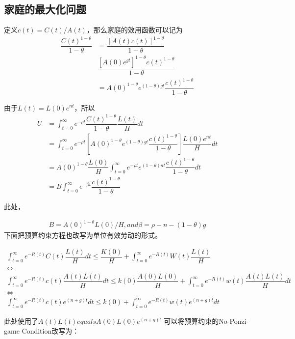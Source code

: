 \subsection{家庭的最大化问题} 

定义$  c(t)=C(t)/A(t) $，那么家庭的效用函数可以记为
\begin{align}
	\dfrac{C(t)^{1-\theta}}{1-\theta}&=\dfrac{[A(t)c(t)]^{1-\theta}}{1-\theta}
	\\
	&\dfrac{[A(0)e^{gt}]^{1-\theta}c(t)^{1-\theta}}{1-\theta}
	\\
	&=A(0)^{1-\theta}e^{(1-\theta)gt}\dfrac{c(t)^{1-\theta}}{1-\theta}
\end{align}

由于$ L(t) = L(0)e^{nt} $，所以
\begin{align}
	U&=\int_{t=0}^{\infty}e^{-\rho t}\dfrac{C(t)^{1-\theta}}{1-\theta}
	\dfrac{L(t)}{H}dt
	\\
	&=\int_{t=0}^{\infty}e^{-\rho t}
	\left[
	A(0)^{1-\theta}e^{(1-\theta)gt}\dfrac{c(t)^{1-\theta}}{1-\theta}
	\right]\dfrac{L(0)e^{nt}}{H}dt
	\\
	&=A(0)^{1-\theta}\dfrac{L(0)}{H}\int_{t=0}^{\infty}e^{-\rho t}
	e^{(1-\theta)nt}\dfrac{c(t)^{1-\theta}}{1-\theta}dt
	\\
	&=B\int_{t=0}^{\infty}e^{-\beta t}\dfrac{c(t)^{1-\theta}}{1-\theta}
\end{align}

此处，

\begin{gather}
	B=A(0)^{1-\theta}L(0)/H ,and \beta=\rho-n-(1-\theta)g
\end{gather}
下面把预算约束方程也改写为单位有效劳动的形式。

\begin{gather}
\int_{t=0}^{\infty}e^{-R(t)}C(t)\dfrac{L(t)}{H}dt\le \dfrac{K(0)}{H}+\int_{t=0}^{\infty}e^{-R(t)}W(t)
\dfrac{L(t)}{H}
\\
\Longleftrightarrow
\\
\int_{t=0}^{\infty}e^{-R(t)}c(t)\dfrac{A(t)L(t)}{H}dt
\le
k(0)\dfrac{A(0)L(0)}{H}+\int_{t=0}^{\infty}e^{-R(t)}w(t)\dfrac{A(t)L(t)}{H}dt
\\
\Longleftrightarrow
\\
\int_{t=0}^{\infty}e^{-R(t)}c(t)e^{(n+g)t}dt
\le
k(0)+\int_{t=0}^{\infty}e^{-R(t)}w(t)e^{(n+g)t}dt
\end{gather}



此处使用了$ A(t)L(t) equals A(0)L(0)e^{(n+g)t}$
可以将预算约束的No-Ponzi-game Condition改写为：


